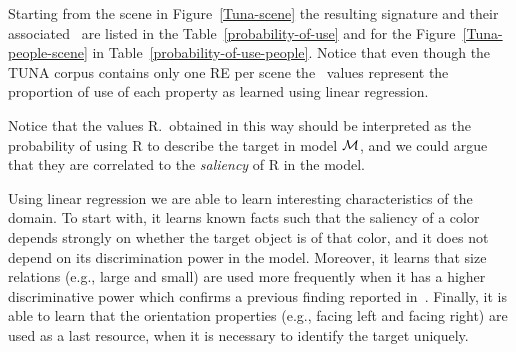 Starting from the scene in Figure~\ref{Tuna-scene}
the resulting signature and their associated \puse\ are listed in the Table~\ref{probability-of-use} and for the Figure~\ref{Tuna-people-scene} in Table~\ref{probability-of-use-people}. Notice that even though the TUNA corpus contains only one RE per scene the \puse~values represent the proportion of use of each property as learned using linear regression. 

Notice that the values R.\puse\ obtained in this way should be interpreted as the probability of using R to describe the target in model 
$\mathcal{M}$, and we could argue that they are correlated to the \emph{saliency} of R in the model.  

Using linear regression we are able to learn interesting characteristics of the domain. To start with, it learns known facts such that the 
saliency of a color depends strongly on whether the target object is of that color, and it does not depend on its discrimination power 
in the model. Moreover, it learns that size relations (e.g., large and small) are used more frequently when it has a higher discriminative power
which confirms a previous finding reported in~\cite{viet:gene11}. Finally, it is able to learn that the orientation properties (e.g., facing left and facing right) are used as a last resource, when it is necessary to identify the target uniquely. 

